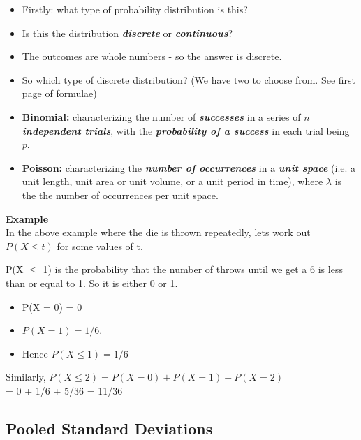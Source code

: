 \documentclass[]{report}
\begin{document}
{
\begin{itemize}
\item Firstly: what type of probability distribution is this?

\item Is this the distribution \textbf{\emph{discrete}} or  \textbf{\emph{continuous}}?

\item The outcomes are whole numbers - so the answer is discrete.

\item So which type of discrete distribution? (We have two to choose from. See first page of formulae)


\item \textbf{Binomial:} characterizing the number of \textbf{\emph{successes}} in a series of \textbf{\emph{$n$ independent trials}}, with the \textbf{\emph{probability of a success}} in each trial being $p$.

\item \textbf{Poisson:}  characterizing the \textbf{\emph{number of occurrences}} in a \textbf{\emph{unit space}} (i.e. a unit length, unit area or unit volume, or a unit period in time), where $\lambda$ is the the number of occurrences per unit space.

\end{itemize}
}



\textbf{Example}\\

In the above example where the die is thrown repeatedly, lets work out $P(X \leq t)$ for some values of t.

P(X $\leq$ 1) is the probability that the number of throws until we get a 6 is less than or equal to 1. So it is either 0 or 1. 

\begin{itemize}
\item P(X = 0) = 0 
\item $P(X = 1) = 1/6$.
\item  Hence $P(X \leq 1) = 1/6$
\end{itemize}

Similarly, $P(X \leq 2) = P(X = 0) + P(X = 1) + P(X = 2)$\\ = 0 + 1/6 + 5/36 = 11/36




\subsection{Pooled Standard Deviations}
\end{document}
